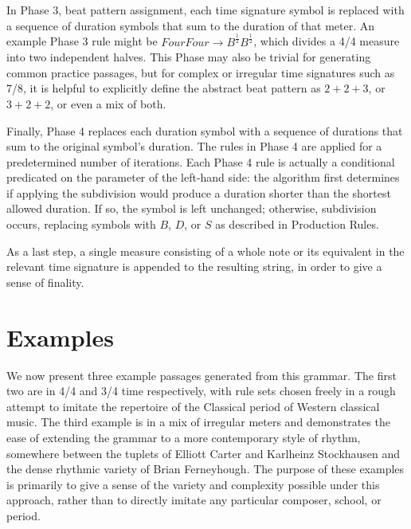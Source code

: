 \documentclass{article}
\begin{document}
In Phase 3, beat pattern assignment, each time signature symbol is replaced with a sequence of duration symbols that sum to the duration of that meter. An example Phase 3 rule might be $FourFour \rightarrow B^\frac{1}{2} B^\frac{1}{2}$, which divides a 4/4 measure into two independent halves. This Phase may also be trivial for generating common practice passages, but for complex or irregular time signatures such as 7/8, it is helpful to explicitly define the abstract beat pattern as $2 + 2 + 3$, or $3 + 2 + 2$, or even a mix of both.

Finally, Phase 4 replaces each duration symbol with a sequence of durations that sum to the original symbol's duration. The rules in Phase 4 are applied for a predetermined number of iterations. Each Phase 4 rule is actually a conditional predicated on the parameter of the left-hand side: the algorithm first determines if applying the subdivision would produce a duration shorter than the shortest allowed duration. If so, the symbol is left unchanged; otherwise, subdivision occurs, replacing symbols with $B$, $D$, or $S$ as described in Production Rules.

As a last step, a single measure consisting of a whole note or its equivalent in the relevant time signature is appended to the resulting string, in order to give a sense of finality.


\section{Examples}

We now present three example passages generated from this grammar. The first two are in 4/4 and 3/4 time respectively, with rule sets chosen freely in a rough attempt to imitate the repertoire of the Classical period of Western classical music. The third example is in a mix of irregular meters and demonstrates the ease of extending the grammar to a more contemporary style of rhythm, somewhere between the tuplets of Elliott Carter and Karlheinz Stockhausen and the dense rhythmic variety of Brian Ferneyhough. The purpose of these examples is primarily to give a sense of the variety and complexity possible under this approach, rather than to directly imitate any particular composer, school, or period. %
\end{document}
